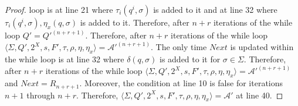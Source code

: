 \begin{proof}
    loop is at line 21 where $\tau_i(q^i, \sigma)$ is added to it and at line
    32 where $\tau_i(q^i, \sigma), \eta_x(q, \sigma)$ is added to it. Therefore,
    after $n+r$ iterations of the while loop $Q' = Q'^{(n+r+1)}$.
    Therefore, after $n+r$ iterations of the while loop $\langle \Sigma,
      Q', 2^X, s, F', \tau, \rho, \eta, \eta_x \rangle = \mathcal{A}'^{(n+r+1)}$.
    The only time $Next$ is updated within the while loop is at line 32 where
    $\delta(q, \sigma)$ is added to it for $\sigma \in \Sigma$. Therefore, after
    $n+r$ iterations of the while loop $\langle \Sigma, Q', 2^X, s, F', \tau,
      \rho, \eta, \eta_x \rangle = \mathcal{A}'^{(n+r+1)}$ and $Next = R_{n+r+1}$.
    Moreover, the condition at line 10 is false for iterations $n+1$ through
    $n+r$. Therefore, $\langle \Sigma, Q', 2^X, s, F', \tau, \rho, \eta, \eta_x
      \rangle = \mathcal{A}'$ at line 40.
  \end{proof}
